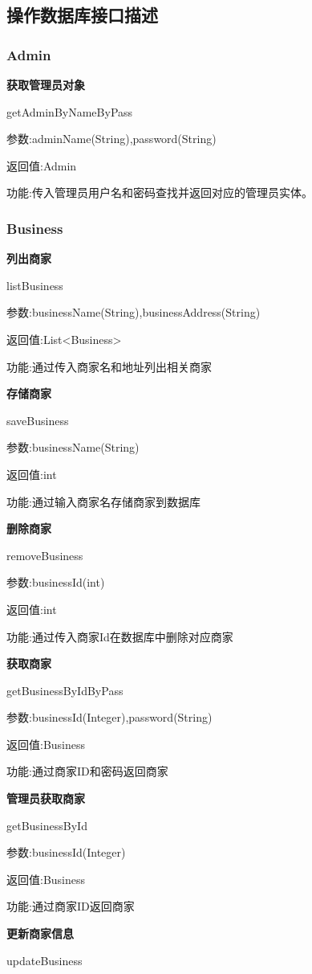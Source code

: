 \subsection{操作数据库接口描述}
\subsubsection{Admin}
\textbf{获取管理员对象}

getAdminByNameByPass

参数:adminName(String),password(String)

返回值:Admin

功能:传入管理员用户名和密码查找并返回对应的管理员实体。

\subsubsection{Business}
\textbf{列出商家}

listBusiness

参数:businessName(String),businessAddress(String)

返回值:List<Business>

功能:通过传入商家名和地址列出相关商家

\textbf{存储商家}

saveBusiness

参数:businessName(String)

返回值:int

功能:通过输入商家名存储商家到数据库

\textbf{删除商家}

removeBusiness

参数:businessId(int)

返回值:int

功能:通过传入商家Id在数据库中删除对应商家

\textbf{获取商家}

getBusinessByIdByPass

参数:businessId(Integer),password(String)

返回值:Business

功能:通过商家ID和密码返回商家

\textbf{管理员获取商家}

getBusinessById

参数:businessId(Integer)

返回值:Business

功能:通过商家ID返回商家

\textbf{更新商家信息}

updateBusiness

